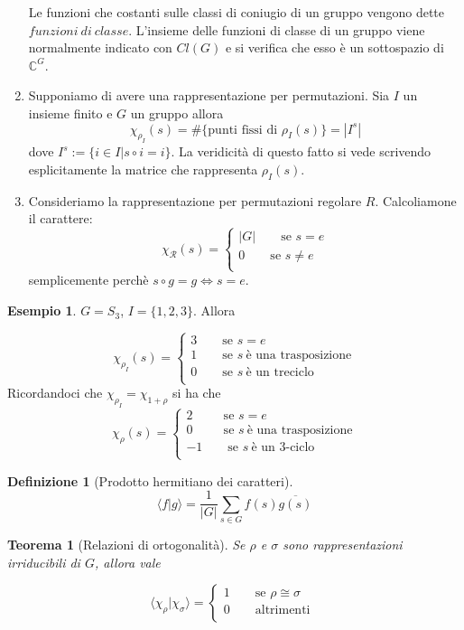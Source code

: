 \documentclass[11pt]{article}
\theoremstyle{plain}
\newtheorem{thm}{Teorema}[section]
\theoremstyle{definition}
\newtheorem{defn}{Definizione}[section]
\newtheorem{exmp}{Esempio}[section]
\theoremstyle{remark}
\newcommand{\dsum}{\displaystyle\sum}
\begin{document}
\begin{enumerate}
Le funzioni che costanti sulle classi di coniugio di un gruppo vengono dette $funzioni\ di\ classe$. L'insieme delle funzioni di classe di un gruppo viene normalmente indicato con $Cl(G)$ e si verifica che esso è un sottospazio di $\mathbb{C}^G$.
	\item Supponiamo di avere una rappresentazione per permutazioni. Sia $I$ un insieme finito e $G$ un gruppo allora
$$\chi_{\rho_{I}}(s)=\#\{ \text{punti fissi di } \rho_I(s) \} = |I^s|$$
dove $I^s:=\{i\in I| s\circ i=i\}$. La veridicità di questo fatto si vede scrivendo esplicitamente la matrice che rappresenta $\rho_I(s)$.
	\item Consideriamo la rappresentazione per permutazioni regolare $R$. Calcoliamone il carattere:
	\[ \chi_{\mathcal{R}}(s) = \begin{cases}
|G| \qquad \text{se } s=e \\
0 \qquad \text{se } s\neq e\\
\end{cases} \]
semplicemente perchè $s\circ g=g\Leftrightarrow s=e$.
\end{enumerate}
\begin{exmp}
$G=S_3$, $I=\{1,2,3\}$. Allora

\[ \chi_{\rho_I}(s) = \begin{cases}
3 \qquad \text{se } s=e \\
1 \qquad \text{se } s\ \text{è una trasposizione}\\
0 \qquad \text{se } s\ \text{è un treciclo}\\
\end{cases} \]
Ricordandoci che $\chi_{\rho_I}=\chi_{1+\rho}$ si ha che
\[ \chi_{\rho}(s) = \begin{cases}
2 \qquad \ \ \text{se } s=e \\
0 \qquad \ \ \text{se } s\ \text{è una trasposizione}\\
-1\qquad \text{se } s\ \text{è un } 3\text{-ciclo}\\
\end{cases} \]
\end{exmp}

\begin{defn}[Prodotto hermitiano dei caratteri]

\[ \langle f | g \rangle = \dfrac{1}{|G|} \dsum_{s \in G} f(s)\overline{ g(s)} \]

\end{defn}


\begin{thm}[Relazioni di ortogonalità]
Se $\rho$ e $\sigma$ sono rappresentazioni irriducibili di $G$, allora vale

\[\langle \chi_{\rho}|\chi_{\sigma} \rangle = \begin{cases}
1 \qquad \text{se } \rho \cong \sigma \\
0 \qquad \text{altrimenti }\\
\end{cases} \]
\label{relazione di ortogonalita}
\end{thm}
\end{document}
